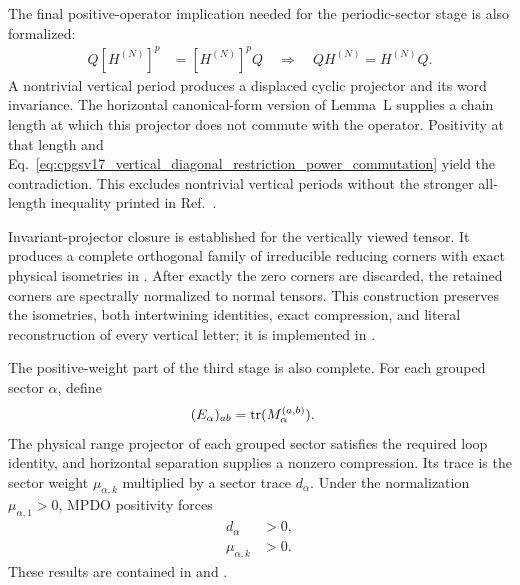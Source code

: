\documentclass{article}
\begin{document}
The final positive-operator implication needed for the periodic-sector stage
is also formalized:
\begin{align}
    Q[H^{(N)}]^p
     & =[H^{(N)}]^pQ
    \quad\Longrightarrow\quad
    QH^{(N)}=H^{(N)}Q.
    \label{eq:cpgsv17_vertical_diagonal_restriction_power_commutation}
\end{align}
A nontrivial vertical period produces a displaced cyclic projector and its word
invariance. The horizontal canonical-form version of Lemma~L supplies a chain
length at which this projector does not commute with the operator. Positivity
at that length and
Eq.~\ref{eq:cpgsv17_vertical_diagonal_restriction_power_commutation} yield the
contradiction. This excludes nontrivial vertical periods without the stronger
all-length inequality printed in Ref.~\cite{Cirac2016MPDO_arXiv}.

Invariant-projector closure is established for the vertically viewed tensor.
It produces a complete orthogonal family of irreducible reducing corners with
exact physical isometries in
. After exactly the zero corners
are discarded, the retained corners are spectrally normalized to normal
tensors. This construction preserves the isometries, both intertwining
identities, exact compression, and literal reconstruction of every vertical
letter; it is implemented in
.

The positive-weight part of the third stage is also complete. For each grouped
sector $\alpha$, define
\begin{align}
    (E_\alpha)_{ab}
     & =\operatorname{tr}(M_\alpha^{(a,b)}).
    \label{eq:cpgsv17_vertical_diagonal_restriction_sector_trace_matrix}
\end{align}
The physical range projector of each grouped sector satisfies the required
loop identity, and horizontal separation supplies a nonzero compression. Its
trace is the sector weight $\mu_{\alpha,k}$ multiplied by a sector trace
$d_\alpha$. Under the normalization $\mu_{\alpha,1}>0$, MPDO positivity forces
\begin{align}
    d_\alpha
     & >0,
    \label{eq:cpgsv17_vertical_diagonal_restriction_positive_sector_trace} \\
    \mu_{\alpha,k}
     & >0.
    \label{eq:cpgsv17_vertical_diagonal_restriction_positive_sector_weight}
\end{align}
These results are contained in
 and
.
\end{document}
